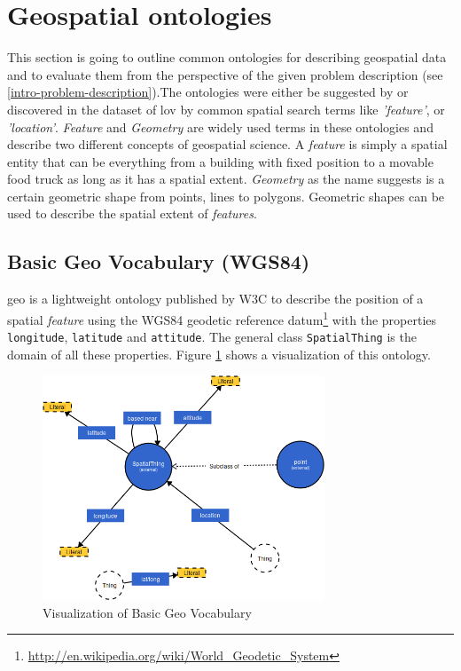 \documentclass[draft,final]{vutinfth} %
\begin{document}
\section{Geospatial ontologies}
\label{related-work-geospatial-ontologies}
This section is going to outline common ontologies for describing geospatial data and to evaluate them from the perspective of the given problem description (see \ref{intro-problem-description}).The ontologies were either be suggested by \cite{tandy_spatial_????} or discovered in the dataset of \gls{lov} by common spatial search terms like \textit{'feature'},  or \textit{'location'}. \textit{Feature} and \textit{Geometry} are widely used terms in these ontologies and describe two different concepts of geospatial science. A \textit{feature}  is simply a spatial entity that can be everything from a building with fixed position to a movable food truck as long as it has a spatial extent. \textit{Geometry} as the name suggests is a certain geometric shape from points, lines to polygons. Geometric shapes can be used to describe  the spatial extent of \textit{features}.

\subsection{Basic Geo Vocabulary (WGS84)}
\label{related-work-geospatial-ontologies-wgs84}

\gls{geo}\cite{brickley_basic_2003} is a lightweight ontology published by W3C to describe the position of a spatial \textit{feature} using the WGS84 geodetic reference datum\footnote{\url{http://en.wikipedia.org/wiki/World_Geodetic_System}} with the properties \texttt{longitude}, \texttt{latitude} and \texttt{attitude}. The general class \texttt{SpatialThing} is the domain of all these properties. Figure \ref{fig:related-work-geospatial-ontologies:wgs84} shows a visualization of this ontology.

\begin{figure}[H]
    \centering
    \includegraphics[width=0.75\textwidth]{graphics/vocabularies/wgs84.png}
    \caption{Visualization of Basic Geo Vocabulary}
    \label{fig:related-work-geospatial-ontologies:wgs84}
\end{figure}
\end{document}
